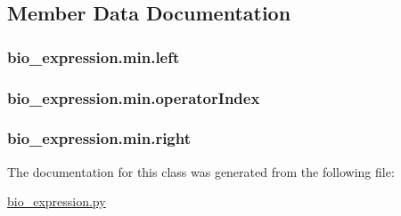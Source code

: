 \subsection{Member Data Documentation}
\hypertarget{classbio__expression_1_1min_aad178b15b6a38a3487f0201ddf9b05da}{
\subsubsection[{left}]{\setlength{\rightskip}{0pt plus 5cm}bio\+\_\+expression.\+min.\+left}}\label{classbio__expression_1_1min_aad178b15b6a38a3487f0201ddf9b05da}
\hypertarget{classbio__expression_1_1min_ad7874a97ff7efd3577be120adbfb1979}{
\subsubsection[{operator\+Index}]{\setlength{\rightskip}{0pt plus 5cm}bio\+\_\+expression.\+min.\+operator\+Index}}\label{classbio__expression_1_1min_ad7874a97ff7efd3577be120adbfb1979}
\hypertarget{classbio__expression_1_1min_a598a7f87c581405f46379788c9cfc682}{
\subsubsection[{right}]{\setlength{\rightskip}{0pt plus 5cm}bio\+\_\+expression.\+min.\+right}}\label{classbio__expression_1_1min_a598a7f87c581405f46379788c9cfc682}


The documentation for this class was generated from the following file\+:\begin{DoxyCompactItemize}
\item 
\hyperlink{bio__expression_8py}{bio\+\_\+expression.\+py}\end{DoxyCompactItemize}
